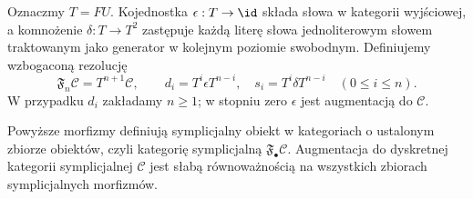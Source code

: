 \begin{definicja}\label{cat:def:dk-free-resolution}
Oznaczmy $T=FU$. Kojednostka $\epsilon:T\to\id$ składa słowa w kategorii wyjściowej, a komnożenie $\delta:T\to T^2$ zastępuje każdą literę słowa jednoliterowym słowem traktowanym jako generator w kolejnym poziomie swobodnym. Definiujemy wzbogaconą rezolucję
\[
 \mathfrak F_n\mathcal C=T^{n+1}\mathcal C,\qquad
 d_i=T^i\epsilon T^{n-i},\quad
 s_i=T^i\delta T^{n-i}\quad(0\leq i\leq n).
\]
W przypadku $d_i$ zakładamy $n\geq1$; w stopniu zero $\epsilon$ jest augmentacją do $\mathcal C$.
\end{definicja}

\begin{stwierdzenie}\label{cat:prop:dk-free-resolution}
Powyższe morfizmy definiują symplicjalny obiekt w kategoriach o ustalonym zbiorze obiektów, czyli kategorię symplicjalną $\mathfrak F_\bullet\mathcal C$. Augmentacja do dyskretnej kategorii symplicjalnej $\mathcal C$ jest słabą równoważnością na wszystkich zbiorach symplicjalnych morfizmów.
\end{stwierdzenie}
